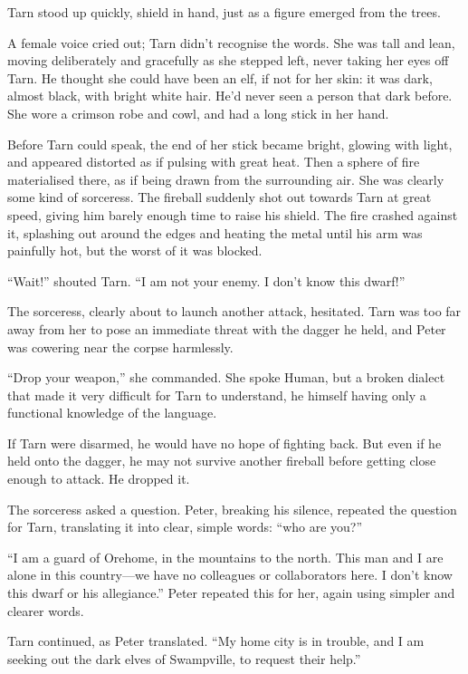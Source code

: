 Tarn stood up quickly, shield in hand, just as a figure emerged from the trees.

A female voice cried out; Tarn didn't recognise the words.  She was tall and lean, moving deliberately and gracefully as she stepped left, never taking her eyes off Tarn.  He thought she could have been an elf, if not for her skin: it was dark, almost black, with bright white hair.  He'd never seen a person that dark before.  She wore a crimson robe and cowl, and had a long stick in her hand.

Before Tarn could speak, the end of her stick became bright, glowing with light, and appeared distorted as if pulsing with great heat.  Then a sphere of fire materialised there, as if being drawn from the surrounding air.  She was clearly some kind of sorceress.  The fireball suddenly shot out towards Tarn at great speed, giving him barely enough time to raise his shield.  The fire crashed against it, splashing out around the edges and heating the metal until his arm was painfully hot, but the worst of it was blocked.

``Wait!'' shouted Tarn.  ``I am not your enemy.  I don't know this dwarf!''

The sorceress, clearly about to launch another attack, hesitated.  Tarn was too far away from her to pose an immediate threat with the dagger he held, and Peter was cowering near the corpse harmlessly.

``Drop your weapon,'' she commanded.  She spoke Human, but a broken dialect that made it very difficult for Tarn to understand, he himself having only a functional knowledge of the language.

If Tarn were disarmed, he would have no hope of fighting back.  But even if he held onto the dagger, he may not survive another fireball before getting close enough to attack.  He dropped it.

The sorceress asked a question.  Peter, breaking his silence, repeated the question for Tarn, translating it into clear, simple words: ``who are you?''

``I am a guard of Orehome, in the mountains to the north.  This man and I are alone in this country---we have no colleagues or collaborators here.  I don't know this dwarf or his allegiance.''  Peter repeated this for her, again using simpler and clearer words.

Tarn continued, as Peter translated.  ``My home city is in trouble, and I am seeking out the dark elves of Swampville, to request their help.''

